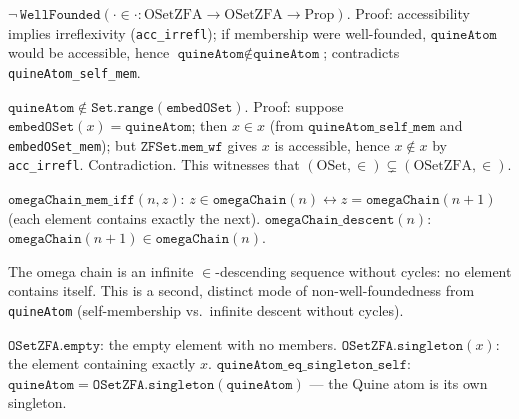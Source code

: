 \begin{theorem}
\label{thm:OSetZFA_mem_not_wf}
\leanok
{}
$\lnot\,\texttt{WellFounded}({\cdot} \in {\cdot} : \mathrm{OSetZFA} \to
\mathrm{OSetZFA} \to \mathrm{Prop})$.
Proof: accessibility implies irreflexivity (\texttt{acc\_irrefl}); if
membership were well-founded, $\texttt{quineAtom}$ would be accessible,
hence $\texttt{quineAtom} \notin \texttt{quineAtom}$; contradicts
\texttt{quineAtom\_self\_mem}.
\end{theorem}

\begin{theorem}
\label{thm:quineAtom_not_in_range}
\leanok
{}
$\texttt{quineAtom} \notin \texttt{Set.range}(\texttt{embedOSet})$.
Proof: suppose $\texttt{embedOSet}(x) = \texttt{quineAtom}$; then
$x \in x$ (from $\texttt{quineAtom\_self\_mem}$ and \texttt{embedOSet\_mem});
but $\texttt{ZFSet.mem\_wf}$ gives $x$ is accessible, hence $x \notin x$
by \texttt{acc\_irrefl}.  Contradiction.
This witnesses that $(\mathrm{OSet}, \in) \subsetneq (\mathrm{OSetZFA}, \in)$.
\end{theorem}

\begin{theorem}
\label{thm:omegaChain}
\leanok
{}
$\texttt{omegaChain\_mem\_iff}(n, z)$: $z \in \texttt{omegaChain}(n)
\leftrightarrow z = \texttt{omegaChain}(n+1)$ (each element contains
exactly the next).
$\texttt{omegaChain\_descent}(n)$: $\texttt{omegaChain}(n+1) \in
\texttt{omegaChain}(n)$.

The omega chain is an infinite $\in$-descending sequence without cycles:
no element contains itself.  This is a second, distinct mode of
non-well-foundedness from \texttt{quineAtom} (self-membership
vs.\ infinite descent without cycles).
\end{theorem}

\begin{definition}
\label{def:OSetZFA_infra}
\leanok
{}
$\texttt{OSetZFA.empty}$: the empty element with no members.
$\texttt{OSetZFA.singleton}(x)$: the element containing exactly $x$.
$\texttt{quineAtom\_eq\_singleton\_self}$:
$\texttt{quineAtom} = \texttt{OSetZFA.singleton}(\texttt{quineAtom})$
--- the Quine atom is its own singleton.
\end{definition}

